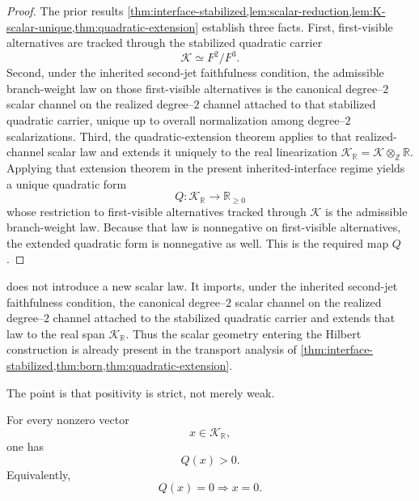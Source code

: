 \begin{proof}
	The prior results
	\cref{thm:interface-stabilized,lem:scalar-reduction,lem:K-scalar-unique,thm:quadratic-extension}
	establish three facts.
	First, first-visible alternatives are tracked through the stabilized
	quadratic carrier
	\[
		\mathcal K\simeq F^{2}/F^{3}.
	\]
	Second, under the inherited second-jet faithfulness condition, the
	admissible branch-weight law on those first-visible alternatives is
	the canonical degree--\(2\) scalar channel on the realized
	degree--\(2\) channel attached to that stabilized quadratic carrier,
	unique up to overall normalization among degree--\(2\) scalarizations.
	Third, the quadratic-extension theorem applies to that realized-channel
	scalar law and extends it uniquely to the real linearization
	\(\mathcal K_{\mathbb R}=\mathcal K\otimes_{\mathbb Z}\mathbb R\).
	Applying that extension theorem in the present inherited-interface
	regime yields a unique quadratic form
	\[
		Q:\mathcal K_{\mathbb R}\to\mathbb R_{\ge 0}
	\]
	whose restriction to first-visible alternatives tracked through
	\(\mathcal K\) is the admissible branch-weight law.  Because that law
	is nonnegative on first-visible alternatives, the extended quadratic
	form is nonnegative as well.  This is the required map \(Q\).
\end{proof}
\begin{remark}
	 does not introduce a new scalar law.
	It imports, under the inherited second-jet faithfulness condition, the
	canonical degree--\(2\) scalar channel on the realized degree--\(2\)
	channel attached to the stabilized quadratic carrier and extends
	that law to the real span \(\mathcal K_{\mathbb R}\).
	Thus the scalar geometry entering the Hilbert construction is already
	present in the transport analysis of
	\cref{thm:interface-stabilized,thm:born,thm:quadratic-extension}.
\end{remark}
The point is that positivity is strict, not merely weak.
\begin{lemma}
	\label{lem:hilbert-strict-positivity}
	For every nonzero vector
	\[
		x\in \mathcal K_{\mathbb R},
	\]
	one has
	\[
		Q(x)>0.
	\]
	Equivalently,
	\[
		Q(x)=0 \Longrightarrow x=0.
	\]
\end{lemma}
